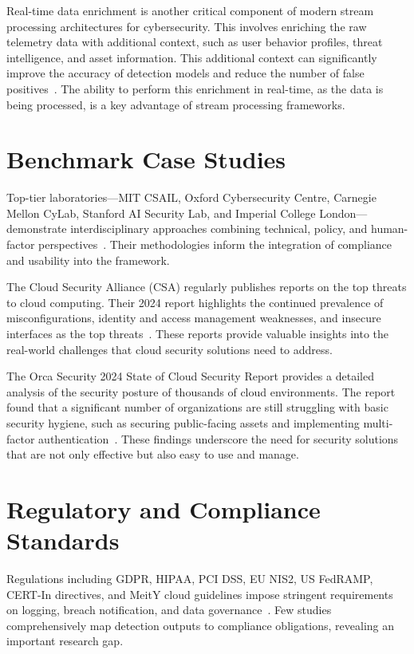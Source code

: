 Real-time data enrichment is another critical component of modern stream processing architectures for cybersecurity. This involves enriching the raw telemetry data with additional context, such as user behavior profiles, threat intelligence, and asset information. This additional context can significantly improve the accuracy of detection models and reduce the number of false positives~\cite{risingwave2024enrichment}. The ability to perform this enrichment in real-time, as the data is being processed, is a key advantage of stream processing frameworks.

\section{Benchmark Case Studies}
Top-tier laboratories---MIT CSAIL, Oxford Cybersecurity Centre, Carnegie Mellon CyLab, Stanford AI Security Lab, and Imperial College London---demonstrate interdisciplinary approaches combining technical, policy, and human-factor perspectives~\cite{mitcsail2023,oxfordcyber2022,cylab2021}. Their methodologies inform the integration of compliance and usability into the framework.

The Cloud Security Alliance (CSA) regularly publishes reports on the top threats to cloud computing. Their 2024 report highlights the continued prevalence of misconfigurations, identity and access management weaknesses, and insecure interfaces as the top threats~\cite{csa2024topthreats}. These reports provide valuable insights into the real-world challenges that cloud security solutions need to address.

The Orca Security 2024 State of Cloud Security Report provides a detailed analysis of the security posture of thousands of cloud environments. The report found that a significant number of organizations are still struggling with basic security hygiene, such as securing public-facing assets and implementing multi-factor authentication~\cite{orca2024casestudy}. These findings underscore the need for security solutions that are not only effective but also easy to use and manage.

\section{Regulatory and Compliance Standards}
Regulations including GDPR, HIPAA, PCI DSS, EU NIS2, US FedRAMP, CERT-In directives, and MeitY cloud guidelines impose stringent requirements on logging, breach notification, and data governance~\cite{gdpr2016,hipaa2013,nis22022,fedramp2023,certin2022directive,meity2017cloud}. Few studies comprehensively map detection outputs to compliance obligations, revealing an important research gap.


